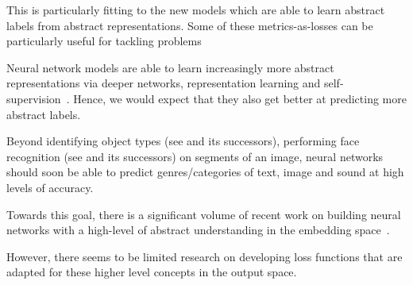 This is particularly fitting to the new models which are able to learn abstract labels from abstract representations.
Some of these metrics-as-losses can be particularly useful for tackling problems


Neural network models are able to learn increasingly more abstract representations via deeper networks, representation learning and self-supervision~\citep[see, e.g.,][]{SS,Rep}. Hence, we would expect that they also get better at predicting more abstract labels. 

Beyond identifying object types (see \cite{YOLO} and its successors), performing face recognition (see \cite{FaceNet} and its successors) on segments of an image, neural networks should soon be able to predict genres/categories of text, image and sound at high levels of accuracy. 

Towards this goal, there is a significant volume of recent work on building neural networks with a high-level of abstract understanding in the embedding space~.

However, there seems to be limited research on developing loss functions that are adapted for these higher level concepts in the output space.













